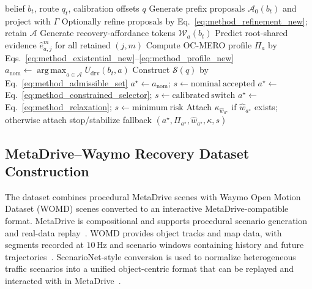 \documentclass[conference]{IEEEtran}
\DeclareMathOperator*{\argmax}{arg\,max}
\begin{document}
\begin{algorithm}[t]
\caption{OC-RAP online selection}
\label{alg:ocrap_selector}
\begin{algorithmic}[1]
\Require belief $b_t$, route $q_t$, calibration offsets $q$
\State Generate prefix proposals $\mathcal A_0(b_t)$ and project with $\Gamma$
\State Optionally refine proposals by Eq.~\eqref{eq:method_refinement_new}; retain $\mathcal A$
    \State Generate recovery-affordance tokens $\mathcal W_a(b_t)$
    \State Predict root-shared evidence $\widehat e_{a,j}^{m}$ for all retained $(j,m)$
    \State Compute OC-MERO profile $\Pi_a$ by Eqs.~\eqref{eq:method_existential_new}--\eqref{eq:method_profile_new}
\EndFor
\State $a_{\mathrm{nom}}\gets\argmax_{a\in\mathcal A}U_{\mathrm{drv}}(b_t,a)$
\State Construct $\mathcal S(q)$ by Eq.~\eqref{eq:method_admissible_set}
    \State $a^\star\gets a_{\mathrm{nom}}$; $s\gets\mathrm{nominal\ accepted}$
    \State $a^\star\gets$ Eq.~\eqref{eq:method_constrained_selector}; $s\gets\mathrm{calibrated\ switch}$
\Else
    \State $a^\star\gets$ Eq.~\eqref{eq:method_relaxation}; $s\gets\mathrm{minimum\ risk}$
\EndIf
\State Attach $\kappa_{\hat w_{a^\star}}$ if $\hat w_{a^\star}$ exists; otherwise attach stop/stabilize fallback
\State \Return $(a^\star,\Pi_{a^\star},\hat w_{a^\star},\kappa,s)$
\end{algorithmic}
\end{algorithm}

\subsection{MetaDrive--Waymo Recovery Dataset Construction}
\label{app:dataset_construction_new}

The dataset combines procedural MetaDrive scenes with Waymo Open Motion Dataset (WOMD) scenes converted to an interactive MetaDrive-compatible format.  MetaDrive is compositional and supports procedural scenario generation and real-data replay~\cite{li2022metadrive}.  WOMD provides object tracks and map data, with segments recorded at $10\,\mathrm{Hz}$ and scenario windows containing history and future trajectories~\cite{ettinger2021large}.  ScenarioNet-style conversion is used to normalize heterogeneous traffic scenarios into a unified object-centric format that can be replayed and interacted with in MetaDrive~\cite{li2023scenarionet}.
\end{document}
